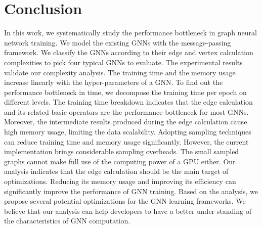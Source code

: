 \section{Conclusion}
\label{sec:conclusion}

In this work, we systematically study the performance bottleneck in graph neural network training.
We model the existing GNNs with the message-passing framework.
We classify the GNNs according to their edge and vertex calculation complexities to pick four typical GNNs to evaluate.
The experimental results validate our complexity analysis.
The training time and the memory usage increase linearly with the hyper-parameters of a GNN.
To find out the performance bottleneck in time, we decompose the training time per epoch on different levels.
The training time breakdown indicates that the edge calculation and its related basic operators are the performance bottleneck for most GNNs.
Moreover, the intermediate results produced during the edge calculation cause high memory usage, limiting the data scalability.
Adopting sampling techniques can reduce training time and memory usage significantly.
However, the current implementation brings considerable sampling overheads.
The small sampled graphs cannot make full use of the computing power of a GPU either.
Our analysis indicates that the edge calculation should be the main target of optimizations.
Reducing its memory usage and improving its efficiency can significantly improve the performance of GNN training.
Based on the analysis, we propose several potential optimizations for the GNN learning frameworks.
We believe that our analysis can help developers to have a better under standing of the characteristics of GNN computation.

